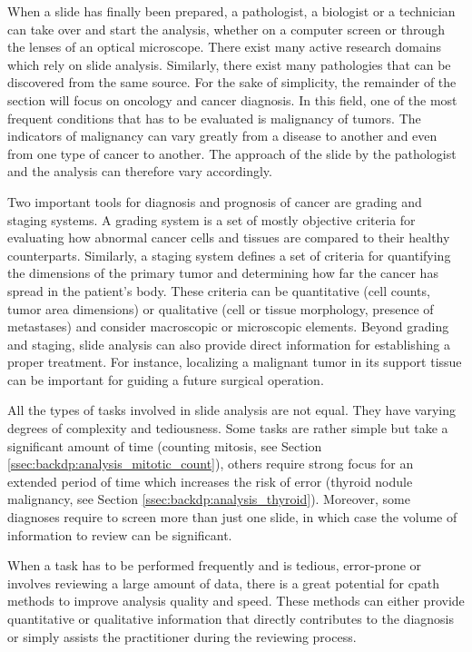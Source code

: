 When a slide has finally been prepared, a pathologist, a biologist or a technician can take over and start the analysis, whether on a computer screen or through the lenses of an optical microscope. There exist many active research domains which rely on slide analysis. Similarly, there exist many pathologies that can be discovered from the same source. For the sake of simplicity, the remainder of the section will focus on oncology and cancer diagnosis. In this field, one of the most frequent conditions that has to be evaluated is malignancy of tumors. The indicators of malignancy can vary greatly from a disease to another and even from one type of cancer to another. The approach of the slide by the pathologist and the analysis can therefore vary accordingly.

Two important tools for diagnosis and prognosis of cancer are grading and staging systems. A grading system is a set of mostly objective criteria for evaluating how abnormal cancer cells and tissues are compared to their healthy counterparts. Similarly, a staging system defines a set of criteria for quantifying the dimensions of the primary tumor and determining how far the cancer has spread in the patient's body. These criteria can be quantitative (\eg cell counts, tumor area dimensions) or qualitative (\eg cell or tissue morphology, presence of metastases) and consider macroscopic or microscopic elements. Beyond grading and staging, slide analysis can also provide direct information for establishing a proper treatment. For instance, localizing a malignant tumor in its support tissue can be important for guiding a future surgical operation. 

All the types of tasks involved in slide analysis are not equal. They have varying degrees of complexity and tediousness. Some tasks are rather simple but take a significant amount of time (\eg counting mitosis, see Section \ref{ssec:backdp:analysis_mitotic_count}), others require strong focus for an extended period of time which increases the risk of error (\eg thyroid nodule malignancy, see Section \ref{ssec:backdp:analysis_thyroid}). Moreover, some diagnoses require to screen more than just one slide, in which case the volume of information to review can be significant. 

When a task has to be performed frequently and is tedious, error-prone or involves reviewing a large amount of data, there is a great potential for \acrlong{cpath} methods to improve analysis quality and speed. These methods can either provide quantitative or qualitative information that directly contributes to the diagnosis or simply assists the practitioner during the reviewing process. %

